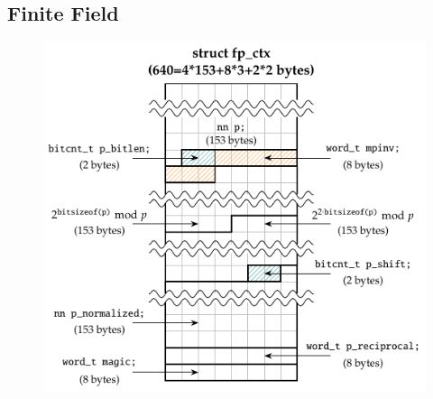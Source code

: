\newpage
\subsection{Finite Field}
\begin{figure}[h!]\centering
	\includegraphics[scale=1.25]{struct-tikz/fp_ctx.pdf}
\end{figure}
